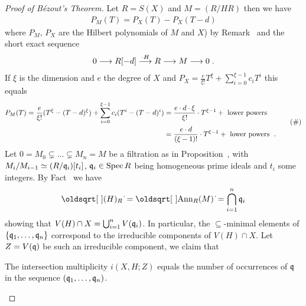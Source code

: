 \documentclass[a4paper,parskip=half,numbers=enddot, DIV=12]{scrreprt}
\begin{document}
\begin{proof}[Proof of B\'ezout's Theorem]
    Let $R=S(X)$ and $M=(R/HR)$ then we have
    \begin{align*}
        P_M(T) = P_X(T) - P_X(T-d)
    \end{align*}
    where $P_M$, $P_X$ are the Hilbert polynomials of $M$ and $X$) by Remark~ and the short exact sequence
    \begin{align*}
        0\morphism R[-d] \morphism[\cdot H]R \morphism M \morphism 0\;.
    \end{align*}
    If $\xi$ is the dimension and $e$ the degree of $X$ and $P_X=\frac{e}{\xi!}T^\xi+\sum_{i=0}^{\xi-1}c_iT^i$ this equals
    \begin{align*}
    \begin{split}
        P_M(T)=\frac{e}{\xi!}(T^\xi-(T-d)^\xi) + \sum_{i=0}^{\xi-1} c_i(T^i- (T-d)^i) &= \frac{e\cdot d\cdot \xi}{\xi!}\cdot T^{\xi-1} + \text{ lower powers } \\
        &= \frac{e\cdot d}{(\xi-1)!}\cdot T^{\xi-1} +\text{ lower powers }\;.
        \end{split}\tag{\#}\lbl{eq:bezout}
    \end{align*}
    Let $0=M_0\subsetneq \ldots \subsetneq M_n = M$ be a filtration as in Proposition~, with $M_i/M_{i-1} \simeq (R/\mathfrak{q}_i)[t_i]$, $\mathfrak{q}_i\in\operatorname{Spec} R$ being homogeneous prime ideals and $t_i$ some integers. By Fact~ we have    
    \begin{align*}
        \sqrt{(H)_R} = \sqrt{\Ann_R(M)} = \bigcap_{i=1}^n \qq_i
    \end{align*}
    showing that $V(H)\cap X = \bigcup_{i=1}^n V(\mathfrak{q}_i)$. In particular, the $\subseteq$-minimal elements of $\{\mathfrak{q}_1,\ldots,\mathfrak{q}_n\}$ correspond to the irreducible components of $V(H)\cap X$. Let $Z=V(\mathfrak{q})$ be such an irreducible component, we claim that 
    \begin{claim}
    	The intersection multiplicity $i(X,H;Z)$ equals the number of occurrences of $\mathfrak{q}$ in the sequence $(\mathfrak{q}_1,\ldots,\mathfrak{q}_n)$.
    \end{claim}
    

\end{proof}
\end{document}
